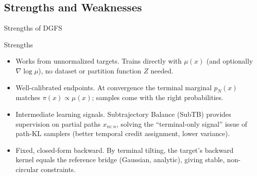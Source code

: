 \documentclass[aspectratio=169,xcolor=dvipsnames]{beamer}
\begin{document}
\subsection{Strengths and Weaknesses}

\begin{frame}{Strengths of DGFS}
\footnotesize

\begin{block}{Strengths}
\begin{itemize}\itemsep2pt
  \item Works from unnormalized targets. Trains directly with \(\mu(x)\) (and optionally \(\nabla \log \mu\)), no dataset or partition function \(Z\) needed.
  \item Well-calibrated endpoints. At convergence the terminal marginal \(p_N(x)\) matches \(\pi(x) \propto \mu(x)\); samples come with the right probabilities.
  \item Intermediate learning signals. Subtrajectory Balance (SubTB) provides supervision on partial paths \(x_{m:n}\), solving the “terminal-only signal” issue of path-KL samplers (better temporal credit assignment, lower variance).
  \item Fixed, closed-form backward. By terminal tilting, the target’s backward kernel equals the reference bridge (Gaussian, analytic), giving stable, non-circular constraints.
\end{itemize}
\end{block}

\end{frame}
\end{document}

